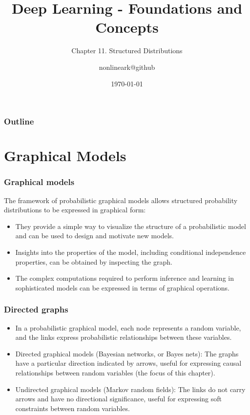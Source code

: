 \documentclass{beamer}
\title{Deep Learning - Foundations and Concepts}
\subtitle{Chapter 11. Structured Distributions}
\author{nonlineark@github}
\date{\today}
\begin{document}
\begin{frame}
    \titlepage
\end{frame}

\begin{frame}
    \frametitle{Outline}
    \tableofcontents
\end{frame}

\section{Graphical Models}

\begin{frame}
    \frametitle{Graphical models}
    The framework of probabilistic graphical models allows structured probability distributions to be expressed in graphical form:
    \begin{itemize}
        \item They provide a simple way to visualize the structure of a probabilistic model and can be used to design and motivate new models.
        \item Insights into the properties of the model, including conditional independence properties, can be obtained by inspecting the graph.
        \item The complex computations required to perform inference and learning in sophisticated models can be expressed in terms of graphical operations.
    \end{itemize}
\end{frame}

\begin{frame}
    \frametitle{Directed graphs}
    \begin{itemize}
        \item In a probabilistic graphical model, each node represents a random variable, and the links express probabilistic relationships between these variables.
        \item Directed graphical models (Bayesian networks, or Bayes nets): The graphs have a particular direction indicated by arrows, useful for expressing causal relationships between random variables (the focus of this chapter).
        \item Undirected graphical models (Markov random fields): The links do not carry arrows and have no directional significance, useful for expressing soft constraints between random variables.
    \end{itemize}
\end{frame}
\end{document}
